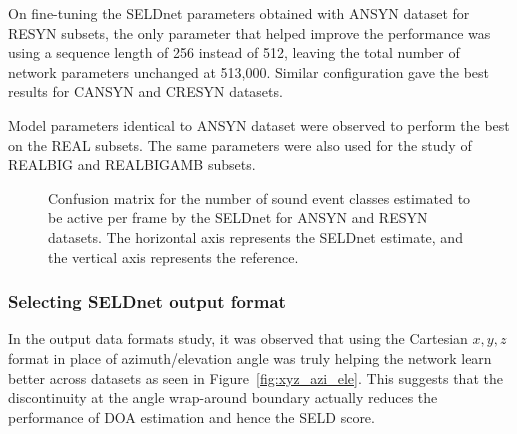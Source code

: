 \documentclass[journal]{IEEEtran}
\begin{document}
On fine-tuning the SELDnet parameters obtained with ANSYN dataset for RESYN subsets, the only parameter that helped improve the performance was using a sequence length of 256 instead of 512, leaving the total number of network parameters unchanged at 513,000. Similar configuration gave the best results for CANSYN and CRESYN datasets.

Model parameters identical to ANSYN dataset were observed to perform the best on the REAL subsets. The same parameters were also used for the study of REALBIG and REALBIGAMB subsets. 







\begin{figure}[!b]
\captionsetup[subfigure]{width=6em}
\centering		
    \subfloat[ANSYN $O1$]{{\texttt{[image: o1ae]}}}%
    \hspace{15pt}     
    \subfloat[RESYN $O1$]{{\texttt{[image: o1e]}}}%
    \vspace{3pt}
    \subfloat[ANSYN $O2$]{{\texttt{[image: o2ae]}}\label{fig:ansyn_o2}}%
    \subfloat[RESYN $O2$]{{\texttt{[image: o2e]}}}%
    \vspace{4pt}
    \subfloat[ANSYN $O3$]{{\texttt{[image: o3ae]}}}%
    \subfloat[RESYN $O3$]{{\texttt{[image: o3e]}}}%
\caption{Confusion matrix for the number of sound event classes estimated to be active per frame by the SELDnet for ANSYN and RESYN datasets. The horizontal axis represents the SELDnet estimate, and the vertical axis represents the reference.}
\label{fig:conf_mat}

\end{figure}





\subsubsection{Selecting SELDnet output format}
In the output data formats study, it was observed that using the Cartesian $x, y, z$ format in place of azimuth/elevation angle was truly helping the network learn better across datasets as seen in Figure~\ref{fig:xyz_azi_ele}. This suggests that the discontinuity at the angle wrap-around boundary actually reduces the performance of DOA estimation and hence the SELD score.
\end{document}
